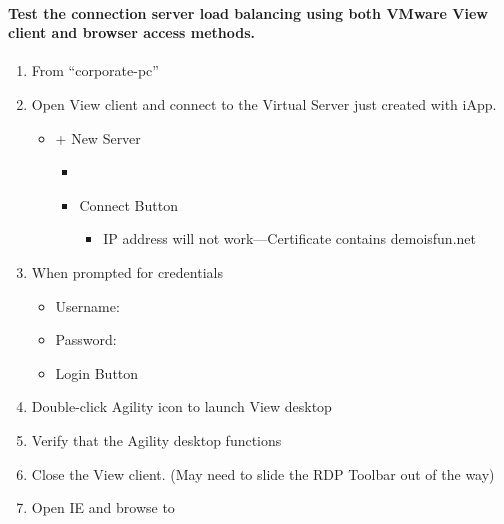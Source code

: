 \documentclass[letterpaper,10pt,english]{sphinxmanual}
\begin{document}
\paragraph{Test the connection server load balancing using both VMware View client and browser access methods.}
\label{\detokenize{class2/module1/lab1:test-the-connection-server-load-balancing-using-both-vmware-view-client-and-browser-access-methods}}\begin{enumerate}
\item {} 
From “corporate-pc”

\item {} 
Open View client and connect to the Virtual Server just created with
iApp.
\begin{itemize}
\item {} 
+ New Server
\begin{itemize}
\item {} 

\item {} 
Connect Button
\begin{itemize}
\item {} 
IP address will not work—Certificate contains demoisfun.net

\end{itemize}

\end{itemize}

\end{itemize}

\item {} 
When prompted for credentials
\begin{itemize}
\item {} 
Username: 

\item {} 
Password: 

\item {} 
Login Button

\end{itemize}

\item {} 
Double-click Agility icon to launch View desktop

\item {} 
Verify that the Agility desktop functions

\item {} 
Close the View client. (May need to slide the RDP Toolbar out of the
way)

\item {} 
Open IE and browse to 


\end{enumerate}
\end{document}
